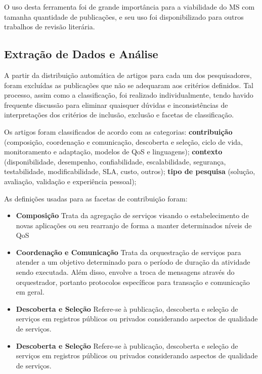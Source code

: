O uso desta ferramenta foi de grande importância para a viabilidade do MS com tamanha quantidade de publicações, e seu uso foi disponibilizado para outros trabalhos de revisão literária.

\subsection{Extração de Dados e Análise}


A partir da distribuição automática de artigos para cada um dos pesquisadores, foram excluídas as publicações que não se adequaram  aos critérios definidos. Tal processo, assim como a classificação, foi realizado individualmente, tendo havido frequente discussão para eliminar quaisquer dúvidas e inconsistências de interpretações dos critérios de inclusão, exclusão e facetas de classificação. 

Os artigos foram classificados de acordo com as categorias: \textbf{contribuição} (composição, coordenação e comunicação, descoberta e seleção, ciclo de vida, monitoramento e adaptação, modelos de QoS e linguagens); \textbf{contexto} (disponibilidade, desempenho, confiabilidade, escalabilidade, segurança, testabilidade, modificabilidade, SLA, custo, outros); \textbf{tipo de pesquisa} (solução, avaliação, validação e experiência pessoal);

As definições usadas para as facetas de contribuição foram:
\begin{itemize}
\item {\bf Composição} Trata da agregação de serviços visando o estabelecimento de novas aplicações ou seu rearranjo de forma a manter determinados níveis de QoS
\item {\bf Coordenação e Comunicação} Trata da orquestração de serviços para atender a um objetivo determinado para o período de duração da atividade sendo executada. Além disso, envolve a troca de mensagens através do orquestrador, portanto protocolos específicos para transação e comunicação em geral.
\item {\bf Descoberta e Seleção} Refere-se à publicação, descoberta e seleção de serviços em registros públicos ou privados considerando aspectos de qualidade de serviços.
\item {\bf Descoberta e Seleção} Refere-se à publicação, descoberta e seleção de serviços em registros públicos ou privados considerando aspectos de qualidade de serviços.

\end{itemize}

